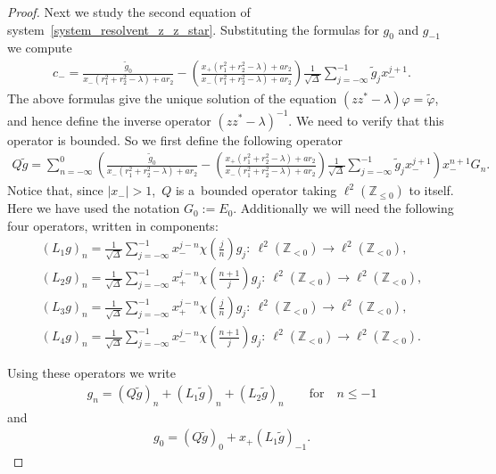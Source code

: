 \documentclass[11pt]{article}
\numberwithin{equation}{section}
\begin{document}
\begin{proof}
Next we study the second equation of system~\eqref{system_resolvent_z_z_star}.
Substituting the formulas for $g_{0}$ and $g_{-1}$ we compute
\begin{gather*}
c_-=\frac{\tilde{g}_0}{x_-(r_1^2+r_2^2-\lambda)+ar_2}-\left(\frac{{x_+(r_1^2+r_2^2-\lambda)+ar_2}}{x_-(r_1^2+r_2^2-\lambda)+ar_2}\right)
\frac{1}{\sqrt{\Delta}}\sum\limits_{j=-\infty}^{-1}\tilde{g}_jx_-^{j+1}.
\end{gather*}
The above formulas give the unique solution of the equation $(zz^*-\lambda)\varphi=\tilde{\varphi}$, and hence def\/ine
the inverse operator $(zz^*-\lambda)^{-1}$.
We need to verify that this operator is bounded.
So we f\/irst def\/ine the following operator
\begin{gather*}
Q\tilde{g}=\!\sum\limits_{n=-\infty}^0\!\! \left(\!\frac{\tilde{g}_0}{x_-(r_1^2+r_2^2-\lambda)+ar_2}-
\!\left(\frac{{x_+(r_1^2+r_2^2-\lambda)+ar_2}}{x_-(r_1^2+r_2^2-\lambda)+ar_2}\right)\!
\frac{1}{\sqrt{\Delta}}\! \sum\limits_{j=-\infty}^{-1}\!\! \tilde{g}_jx_-^{j+1}\!\right)\!x_-^{n+1}G_n.
\end{gather*}
Notice that, since $|x_-|>1$,~$Q$ is a~bounded operator taking $\ell^2({\mathbb Z}_{\leq 0})$ to itself.
Here we have used the notation $G_0:= E_0$.
Additionally we will need the following four operators, written in components:
\begin{gather*}%
\left(L_1g\right)_n =\frac{1}{\sqrt{\Delta}}\sum\limits_{j=-\infty}^{-1}x_-^{j-n}\chi\left(\frac{j}{n}\right)g_j: \
\ell^2({\mathbb Z}_{<0})\to \ell^2({\mathbb Z}_{<0}),
\\
\left(L_2g\right)_n =\frac{1}{\sqrt{\Delta}}\sum\limits_{j=-\infty}^{-1}x_+^{j-n}\chi\left(\frac{n+1}{j}\right)g_j: \
\ell^2({\mathbb Z}_{<0})\to \ell^2({\mathbb Z}_{<0}),
\\
\left(L_3g\right)_n =\frac{1}{\sqrt{\Delta}}\sum\limits_{j=-\infty}^{-1}x_+^{j-n}\chi\left(\frac{j}{n}\right)g_j: \
\ell^2({\mathbb Z}_{<0})\to \ell^2({\mathbb Z}_{<0}),
\\
\left(L_4g\right)_n =\frac{1}{\sqrt{\Delta}}\sum\limits_{j=-\infty}^{-1}x_-^{j-n}\chi\left(\frac{n+1}{j}\right)g_j: \
\ell^2({\mathbb Z}_{<0})\to \ell^2({\mathbb Z}_{<0}).
\end{gather*}

Using these operators we write
\begin{gather*}
g_n=\left(Q\tilde{g}\right)_n+\left(L_1\tilde{g}\right)_n+\left(L_2\tilde{g}\right)_n \qquad\text{for}\quad  n\leq -1
\end{gather*}
and
\begin{gather*}
g_0 =\left(Q\tilde{g}\right)_0+x_+\left(L_1\tilde{g}\right)_{-1}.
\end{gather*}


\end{proof}
\end{document}
